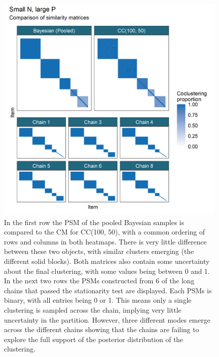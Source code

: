 \documentclass{bioinfo}
\begin{document}
\begin{figure} %
	\centering
	\includegraphics[scale=0.18]{./Images/Simulations/small_n_large_p_base/comp_psms_cm_edited.png}	
	\caption{In the first row the PSM of the pooled Bayesian samples is compared to the CM for CC(100, 50), with a common ordering of rows and columns in both heatmaps. There is very little difference between these two objects, with similar clusters emerging (the different solid blocks). Both matrices also contain some uncertainty about the final clustering, with some values being between 0 and 1. In the next two rows the PSMs constructed from 6 of the long chains that passed the stationarity test are displayed. Each PSMs is binary, with all entries being 0 or 1. This means only a single clustering is sampled across the chain, implying very little uncertainty in the partition. However, three different modes emerge across the different chains showing that the chains are failing to explore the full support of the posterior distribution of the clustering.}
	\label{fig:simSmallNLargePPSMs}
\end{figure}
\end{document}
